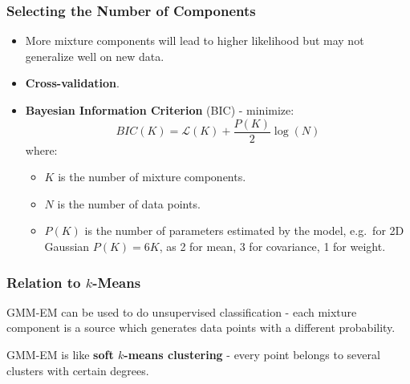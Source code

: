 \documentclass[11pt]{article}
\begin{document}
\subsubsection{Selecting the Number of Components}
\begin{itemize}
  \item More mixture components will lead to higher likelihood but may not generalize well on new data.
  \item \textbf{Cross-validation}.
  \item \textbf{Bayesian Information Criterion} (BIC) - minimize:
    \[
      BIC(K) = \mathcal{L}(K) + \frac{P(K)}{2} \log(N) 
    \]
    where:
    \begin{itemize}
      \item $K$ is the number of mixture components.
      \item $N$ is the number of data points.
      \item $P(K)$ is the number of parameters estimated by the model, e.g.\ for 2D Gaussian $P(K) = 6K$, as 2 for mean, 3 for covariance, 1 for weight.
    \end{itemize}
\end{itemize}

\subsubsection{Relation to $k$-Means}
GMM-EM can be used to do unsupervised classification - each mixture component is a source which generates data points with a different probability.

GMM-EM is like \textbf{soft $k$-means clustering} - every point belongs to several clusters with certain degrees.
\end{document}

